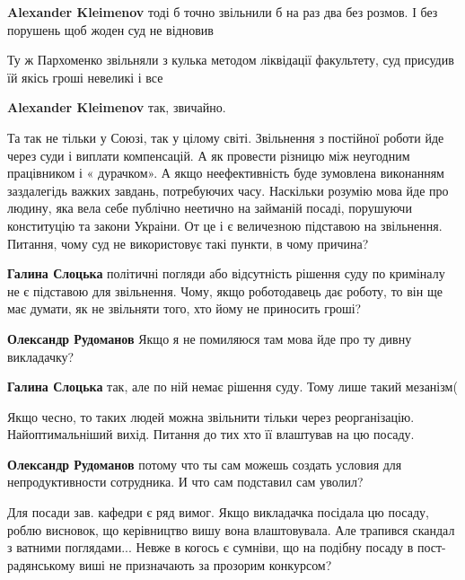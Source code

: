 \begin{itemize}
\begin{itemize}
\textbf{Alexander Kleimenov} тоді б точно звільнили б на раз два без розмов. І без порушень щоб жоден суд не відновив

Ту ж Пархоменко звільняли з кулька методом ліквідації факультету, суд присудив їй якісь гроші невеликі і все

\textbf{Alexander Kleimenov} так, звичайно.

\end{itemize} %


Та так не тільки у Союзі, так у цілому світі. Звільнення з постійної роботи йде
через суди і виплати компенсацій. А як провести різницю між неугодним
працівником і « дурачком». А якщо неефективність буде зумовлена виконанням
заздалегідь важких завдань, потребуючих часу. Наскільки розумію мова йде про
людину, яка вела себе публічно неетично на займаній посаді, порушуючи
конституцію та закони Украіни. От це і є величезною підставою на звільнення.
Питання, чому суд не використовує такі пункти, в чому причина?

\begin{itemize} %
\textbf{Галина Слоцька} політичні погляди або відсутність рішення суду по криміналу не є підставою для звільнення.
Чому, якщо роботодавець дає роботу, то він ще має думати, як не звільняти того, хто йому не приносить гроші?

\textbf{Олександр Рудоманов} Якщо я не помиляюся там мова йде про ту дивну викладачку?


\textbf{Галина Слоцька} так, але по ній немає рішення суду.
Тому лише такий мезанізм(

Якщо чесно, то таких людей можна звільнити тільки через реорганізацію. Найоптимальніший вихід. Питання до тих хто її влаштував на цю посаду.

\textbf{Олександр Рудоманов} потому что ты сам можешь создать условия для непродуктивности сотрудника. И что сам подставил сам уволил?
\end{itemize} %


Для посади зав. кафедри є ряд вимог. Якщо викладачка посідала цю посаду, роблю
висновок, що керівництво вишу вона влаштовувала. Але трапився скандал з ватними
поглядами... Невже в когось є сумніви, що на подібну посаду в пост-радянському
виші не призначають за прозорим конкурсом?


\end{itemize}
